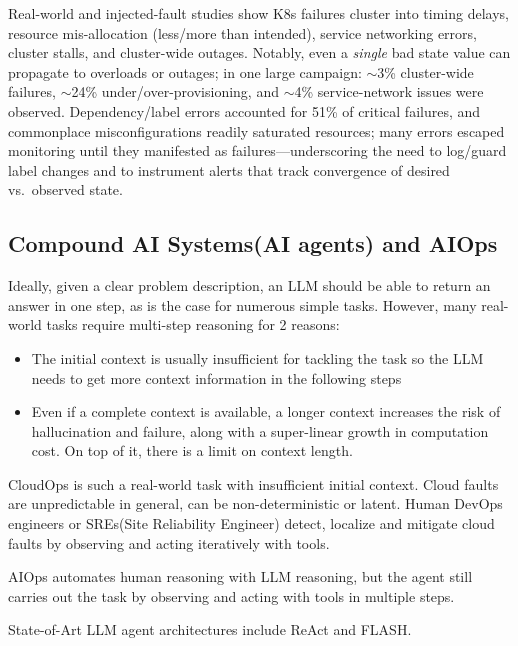 \documentclass[conference]{IEEEtran}
\begin{document}
Real-world and injected-fault studies \cite{10646977} show K8s failures cluster into timing delays, resource mis-allocation (less/more than intended), service networking errors, cluster stalls, and cluster-wide outages. Notably, even a \emph{single} bad state value can propagate to overloads or outages; in one large campaign: $\sim$3\% cluster-wide failures, $\sim$24\% under/over-provisioning, and $\sim$4\% service-network issues were observed. Dependency/label errors accounted for 51\% of critical failures, and commonplace misconfigurations readily saturated resources; many errors escaped monitoring until they manifested as failures—underscoring the need to log/guard label changes and to instrument alerts that track convergence of desired vs.\ observed state.


\subsection{Compound AI Systems(AI agents) and AIOps}
Ideally, given a clear problem description, an LLM should be able to return an answer in one step, as is the case for numerous simple tasks. However, many real-world tasks require multi-step reasoning for 2 reasons: 
        \begin{itemize}
                \item The initial context is usually insufficient for tackling the task so the LLM needs to get more context information in the following steps  
                \item Even if a complete context is available, a longer context increases the risk of hallucination and failure, along with a super-linear growth in computation cost. On top of it, there is a limit on context length.
        \end{itemize}

        CloudOps is such a real-world task with insufficient initial context. Cloud faults are unpredictable in general, can be non-deterministic or latent. Human DevOps engineers or SREs(Site Reliability Engineer) detect, localize and mitigate cloud faults by observing and acting iteratively with tools. 

        AIOps automates human reasoning with LLM reasoning, but the agent still carries out the task by observing and acting with tools in multiple steps.     

        State-of-Art LLM agent architectures include ReAct\cite{yao2023reactsynergizingreasoningacting} and FLASH\cite{zhang2024flash}.
\end{document}
